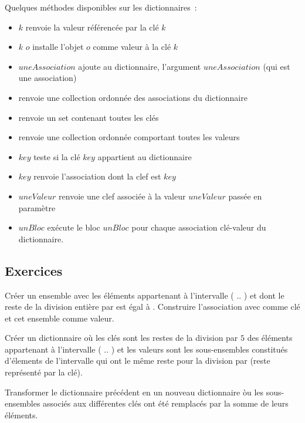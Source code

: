 Quelques m\'ethodes disponibles sur les dictionnaires~:

\begin{itemize}
\item {}$k$ renvoie la valeur r\'ef\'erenc\'ee par la cl\'e $k$
\item {}$k$ $o$ installe l'objet $o$ comme valeur \`a la cl\'e $k$
\item {}$uneAssociation$ ajoute au dictionnaire, l'argument
$uneAssociation$ (qui est une association)
\item {} renvoie une collection ordonn\'ee  des associations du dictionnaire
\item {} renvoie un set contenant toutes les cl\'es
\item {} renvoie une collection ordonn\'ee comportant toutes les valeurs
\item {}$key$ teste si la cl\'e $key$ appartient au dictionnaire 
\item {}$key$ renvoie l'association dont la clef est $key$
\item {}$uneValeur$ renvoie une clef associ\'ee \`a la valeur $uneValeur$ pass\'ee en param\`etre
\item {}$unBloc$ ex\'ecute le bloc $unBloc$ pour chaque association cl\'e-valeur du dictionnaire.
\end{itemize}


\subsection*{Exercices}

\begin{itemize}
\exoitem Cr\'eer un ensemble avec les \'el\'ements appartenant \`a l'intervalle ( .. ) et dont le reste de la division enti\`ere par  est \'egal \`a . Construire l'association avec  comme cl\'e et cet ensemble comme valeur.

\exoitem Cr\'eer un dictionnaire  o\`u les cl\'es sont  les restes de la division par $5$ des \'el\'ements appartenant \`a l'intervalle  ( .. ) et les valeurs sont les sous-ensembles constitu\'es d'\'elements de l'intervalle qui ont le m\^eme reste pour la division par  (reste repr\'esent\'e par la cl\'e).

\exoitem Transformer le dictionnaire pr\'ec\'edent en un nouveau dictionnaire \`ou les sous-ensembles associ\'es aux diff\'erentes cl\'es ont \'et\'e remplac\'es par la somme de leurs \'el\'ements.

\end{itemize}

